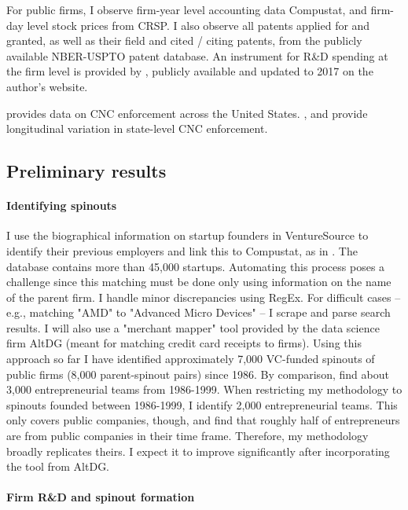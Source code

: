 \documentclass[11pt,english]{article}
\theoremstyle{remark}
\begin{document}
For public firms, I observe firm-year level accounting data Compustat, and firm-day level stock prices from CRSP. I also observe all patents applied for and granted, as well as their field and cited / citing patents, from the publicly available NBER-USPTO patent database. An instrument for R\&D spending at the firm level is provided by \cite{bloom_identifying_2013}, publicly available and updated to 2017 on the author's website.

\cite{starr_noncompetes_2019} provides data on CNC enforcement across the United States. \cite{marx_mobility_2009}, and \cite{jeffers_impact_2018} provide longitudinal variation in state-level CNC enforcement. 

\subsection*{Preliminary results}

\paragraph{Identifying spinouts}

I use the biographical information on startup founders in VentureSource to identify their previous employers and link this to Compustat, as in \cite{gompers_entrepreneurial_2005}. The database contains more than 45,000 startups. Automating this process poses a challenge since this matching must be done only using information on the name of the parent firm. I handle minor discrepancies using RegEx. For difficult cases -- e.g., matching "AMD" to "Advanced Micro Devices" -- I scrape and parse search results. I will also use a "merchant mapper" tool provided by the data science firm AltDG (meant for matching credit card receipts to firms). Using this approach so far I have identified approximately 7,000 VC-funded spinouts of public firms (8,000 parent-spinout pairs) since 1986. By comparison, \cite{gompers_entrepreneurial_2005} find about 3,000 entrepreneurial teams from 1986-1999. When restricting my methodology to spinouts founded between 1986-1999, I identify 2,000 entrepreneurial teams. This only covers public companies, though, and \cite{gompers_entrepreneurial_2005} find that roughly half of entrepreneurs are from public companies in their time frame. Therefore, my methodology broadly replicates theirs. I expect it to improve significantly after incorporating the tool from AltDG. 

\paragraph{Firm R\&D and spinout formation}
\end{document}
